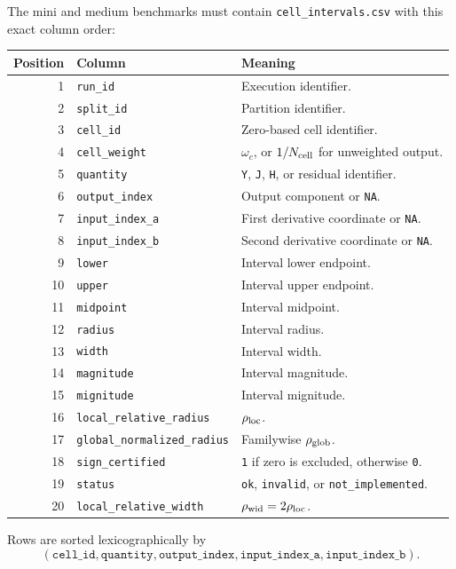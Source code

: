 \documentclass[11pt]{article}
\newcommand{\NA}{\texttt{NA}}
\begin{document}
The mini and medium benchmarks must contain \texttt{cell\_intervals.csv} with
this exact column order:
\begin{center}
\small
\begin{tabularx}{\textwidth}{@{}r l X@{}}
\toprule
Position & Column & Meaning \\
\midrule
1 & \texttt{run\_id} & Execution identifier. \\
2 & \texttt{split\_id} & Partition identifier. \\
3 & \texttt{cell\_id} & Zero-based cell identifier. \\
4 & \texttt{cell\_weight} & \(\omega_c\), or \(1/N_{\rm cell}\) for unweighted output. \\
5 & \texttt{quantity} & \texttt{Y}, \texttt{J}, \texttt{H}, or residual identifier. \\
6 & \texttt{output\_index} & Output component or \NA. \\
7 & \texttt{input\_index\_a} & First derivative coordinate or \NA. \\
8 & \texttt{input\_index\_b} & Second derivative coordinate or \NA. \\
9 & \texttt{lower} & Interval lower endpoint. \\
10 & \texttt{upper} & Interval upper endpoint. \\
11 & \texttt{midpoint} & Interval midpoint. \\
12 & \texttt{radius} & Interval radius. \\
13 & \texttt{width} & Interval width. \\
14 & \texttt{magnitude} & Interval magnitude. \\
15 & \texttt{mignitude} & Interval mignitude. \\
16 & \texttt{local\_relative\_radius} & \(\rho_{\rm loc}\). \\
17 & \texttt{global\_normalized\_radius} & Familywise \(\rho_{\rm glob}\). \\
18 & \texttt{sign\_certified} & \texttt{1} if zero is excluded, otherwise \texttt{0}. \\
19 & \texttt{status} & \texttt{ok}, \texttt{invalid}, or \texttt{not\_implemented}. \\
20 & \texttt{local\_relative\_width} & \(\rho_{\rm wid}=2\rho_{\rm loc}\). \\
\bottomrule
\end{tabularx}
\end{center}
Rows are sorted lexicographically by
\[
 (\texttt{cell\_id},\texttt{quantity},\texttt{output\_index},
 \texttt{input\_index\_a},\texttt{input\_index\_b}).
\]
\end{document}
